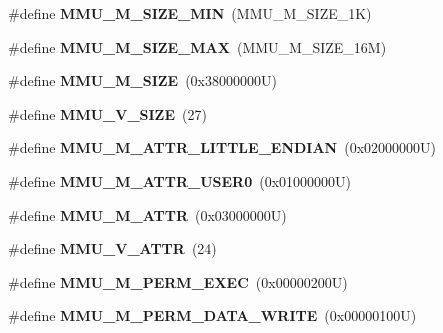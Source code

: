 \begin{DoxyCompactItemize}
\mbox{\label{group__Virtex4MMU_ga1df5ab0999222827c93ffe715860bdc1}} 
\#define {\bfseries M\+M\+U\+\_\+\+M\+\_\+\+S\+I\+Z\+E\+\_\+\+M\+IN}~(M\+M\+U\+\_\+\+M\+\_\+\+S\+I\+Z\+E\+\_\+1K)
\item 
\mbox{\label{group__Virtex4MMU_gab053ea65db7bdc7674f16ffe0bb109d4}} 
\#define {\bfseries M\+M\+U\+\_\+\+M\+\_\+\+S\+I\+Z\+E\+\_\+\+M\+AX}~(M\+M\+U\+\_\+\+M\+\_\+\+S\+I\+Z\+E\+\_\+16M)
\item 
\mbox{\label{group__Virtex4MMU_ga823b6a9c9742a4b3a932721fa0cbe0ea}} 
\#define {\bfseries M\+M\+U\+\_\+\+M\+\_\+\+S\+I\+ZE}~(0x38000000\+U)
\item 
\mbox{\label{group__Virtex4MMU_ga61ded55783abfe10c2f59c6e3e9476a9}} 
\#define {\bfseries M\+M\+U\+\_\+\+V\+\_\+\+S\+I\+ZE}~(27)
\item 
\mbox{\label{group__Virtex4MMU_ga93c3287f01a897e0fcd8b8b129e45cda}} 
\#define {\bfseries M\+M\+U\+\_\+\+M\+\_\+\+A\+T\+T\+R\+\_\+\+L\+I\+T\+T\+L\+E\+\_\+\+E\+N\+D\+I\+AN}~(0x02000000\+U)
\item 
\mbox{\label{group__Virtex4MMU_ga8a4595a461d5e24357044fac1290d044}} 
\#define {\bfseries M\+M\+U\+\_\+\+M\+\_\+\+A\+T\+T\+R\+\_\+\+U\+S\+E\+R0}~(0x01000000\+U)
\item 
\mbox{\label{group__Virtex4MMU_gaefa34e63844b2c93c4532346c6d332fc}} 
\#define {\bfseries M\+M\+U\+\_\+\+M\+\_\+\+A\+T\+TR}~(0x03000000\+U)
\item 
\mbox{\label{group__Virtex4MMU_ga81a7ed47655c2789a97fbbd6314f6710}} 
\#define {\bfseries M\+M\+U\+\_\+\+V\+\_\+\+A\+T\+TR}~(24)
\item 
\mbox{\label{group__Virtex4MMU_ga137bc949e4d0e5ed997da598b5ff2809}} 
\#define {\bfseries M\+M\+U\+\_\+\+M\+\_\+\+P\+E\+R\+M\+\_\+\+E\+X\+EC}~(0x00000200\+U)
\item 
\mbox{\label{group__Virtex4MMU_gad0f25f2df749997b783ef917e343a8d0}} 
\#define {\bfseries M\+M\+U\+\_\+\+M\+\_\+\+P\+E\+R\+M\+\_\+\+D\+A\+T\+A\+\_\+\+W\+R\+I\+TE}~(0x00000100\+U)

\end{DoxyCompactItemize}
